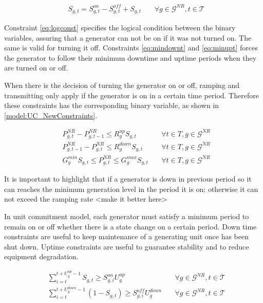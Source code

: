 \documentclass[12pt,LUDisStyle,twosided]{book}
\newcommand{\mc}{\mathcal}
\begin{document}
\begin{subequations}\label{model:ucConstraints}
\begin{alignat}{4}
& S_{g,t} = S^{on}_{g,t} - S^{off}_{g,t} + S_{g,t}  &~& \forall g \in \mc{G}^{NR} , t \in \mc{T} \label{eq:logconst}\end{alignat} 
\end{subequations}

Constraint \ref{eq:logconst} specifies the logical condition between the binary variables, assuring that a generator can not be on if it was not turned on. The same is valid for turning it off. Constraints \ref{eq:mindownt} and \ref{eq:minupt} forces the generator to follow their minimum downtime and uptime periods when they are turned on or off. 

When there is the decision of turning the generator on or off, ramping and transmitting only apply if the generator is on in a certain time period. Therefore these constraints has the corresponding binary variable, as shown in \ref{model:UC_NewConstraints}.

\begin{subequations}\label{model:UC_NewConstraints}
\begin{alignat}{4}
& P^{NR}_{g,t} - P^{NR}_{g,t - 1} \leq R^{up}_{g} S_{g,t} &~& \forall t \in T, g \in \mc{G}^{NR}\label{eq:UCrampUpRateConstraint} \\
& P^{NR}_{g,t -1 } - P^{NR}_{g,t} \leq R^{down}_{g} S_{g,t} &~& \forall t \in T, g \in \mc{G}^{NR}\label{eq:UCrampDownRateConstraint} \\
& G^{min}_{g} S_{g,t}\leq P^{NR}_{g,t} \leq G^{max}_{g} S_{g,t} &~& \forall t \in T, g \in \mc{G}^{NR}\label{eq:UCgenerationBounds}
\end{alignat} 
\end{subequations}
 
It is important to highlight that if a generator is down in previous period so it can reaches the minimum generation level in the period it is on; otherwise it can not exceed the ramping rate <make it better here>

In unit commitment model, each generator must satisfy a minimum period to remain on or off whether there is a state change on a certain period. Down time constraints are  useful to keep maintenance of a generating unit once has been shut down. Uptime constraints are useful to guarantee stability and to reduce equipment degradation. 

\begin{subequations}\label{model:ucMinDownUpConstraints}
\begin{alignat}{4}
& \sum_{i = t}^{t + U^{up}_{g} - 1} S_{g,t} \geq S^{on}_{g,i} U^{up}_{g} &~& \forall g \in \mc{G}^{NR}, t \in \mc{T} \label{eq:mindownt} \\
& \sum_{i = t}^{t + U^{down}_{g} - 1} (1 -S_{g,t}) \geq S^{off}_{g,i} U^{down}_{g} &~& \forall g \in \mc{G}^{NR}, t \in \mc{T} \label{eq:minupt}
\end{alignat} 
\end{subequations}
\end{document}
